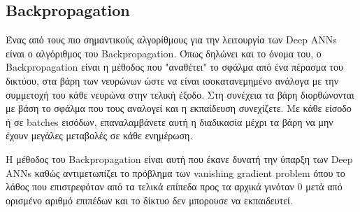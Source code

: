\subsection{Backpropagation}
Ένας από τους πιο σημαντικούς αλγορίθμους για την λειτουργία των Deep ANNs είναι ο αλγόριθμος του Backpropagation. Όπως δηλώνει και το όνομα του, ο Backpropagation είναι η μέθοδος που "αναθέτει" το σφάλμα από ένα πέρασμα του δικτύου, στα βάρη των νευρώνων ώστε να είναι ισοκατανεμημένο ανάλογα με την συμμετοχή του κάθε νευρώνα στην τελική έξοδο. Στη συνέχεια τα βάρη διορθώνονται με βάση το σφάλμα που τους αναλογεί και η εκπαίδευση συνεχίζετε. Με κάθε είσοδο ή σε batches εισόδων, επαναλαμβάνετε αυτή η διαδικασία μέχρι τα βάρη να μην έχουν μεγάλες μεταβολές σε κάθε ενημέρωση.

\par
Η μέθοδος του  Backpropagation είναι αυτή που έκανε δυνατή την ύπαρξη των Deep ANNs καθώς αντιμετωπίζει το πρόβλημα των vanishing gradient problem όπου το λάθος που επιστρεφόταν από τα τελικά επίπεδα προς τα αρχικά γινόταν 0 μετά από ορισμένο αριθμό επιπέδων και το δίκτυο δεν μπορουσε να εκπαιδευτεί.











